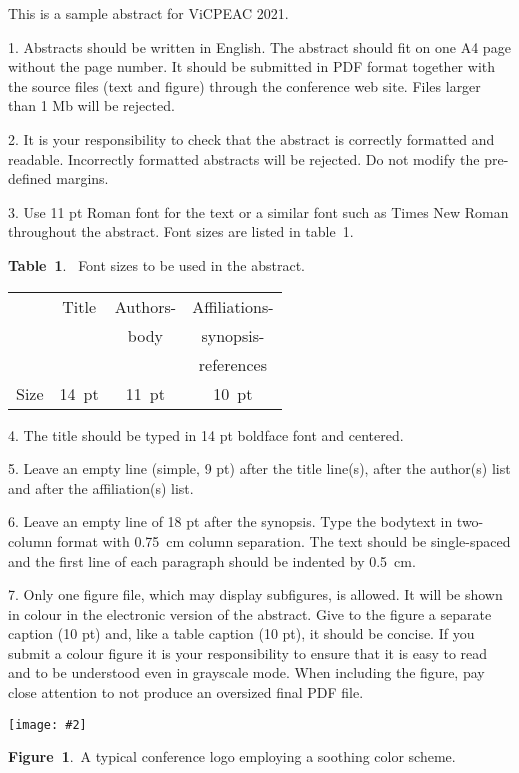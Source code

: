 \documentclass[a4paper,11pt,draft]{article}
\newcommand{\abstracttext}[1]{
\vspace*{0.10cm}
 \columnsep0.75cm
 \begin{multicols}{2} #1 \end{multicols}
}
\newcommand{\capt}[2]{
 \vspace*{-0.3cm}
 \begin{center}
 \begin{minipage}[t]{7.8cm} {\small {\bf Figure~#1}.~#2}
  \end{minipage}
 \end{center}
}
\newcommand{\captTab}[2]{
 \vspace*{-0.1cm}
 \begin{center}
 \begin{minipage}[t]{7.8cm} {\small {\bf Table~#1}.~ #2}
 \end{minipage}
 \end{center}
 \vspace*{0.1cm}
}
\newcommand{\picturelandscape}[2]{
 \vspace*{0.5cm}
 \centerline{
  \texttt{[image: \#2]}
 }
}
\begin{document}
\abstracttext{
This is a sample abstract for ViCPEAC 2021.

1.
Abstracts should be written in English.
The abstract should fit on one A4 page without the page number.
It should be submitted in PDF format together with the source files (text and figure) through the conference web site.
Files larger than 1 Mb will be rejected.

2. It is your responsibility to check that the abstract is correctly formatted and readable.
Incorrectly formatted abstracts will be rejected.
Do not modify the pre-defined margins.

3. Use 11 pt Roman font for the text or a similar font such as Times New Roman throughout the abstract.
Font sizes are listed in table~1.

\begin{center}
\captTab{1}{Font sizes to be used in the abstract.}
\begin{tabular}[b]{lccc}
\hline
   & Title & Authors-               & Affiliations-  \\
   &       & body                  & synopsis- \\
   &       &                       & references  \\
\hline
Size & 14~pt & 11~pt & 10~pt  \\
\hline
\end{tabular}
\end{center}

4. The title should be typed in 14 pt boldface font and centered.

5. Leave an empty line (simple, 9 pt) after the title line(s), after the author(s) list and after the affiliation(s) list.

6. Leave an empty line of 18 pt after the synopsis.
Type the bodytext in two-column format with 0.75~cm column separation.
The text should be single-spaced and the first line of each paragraph should be indented by 0.5~cm.

7. Only one figure file, which may display subfigures, is allowed.
It will be shown in colour in the electronic version of the abstract.
Give to the figure a separate caption (10 pt) and, like a table caption (10 pt), it should be concise.
If you submit a colour figure it is your responsibility to ensure that it is easy to read and to be understood even in grayscale mode.
When including the figure, pay close attention to not produce an oversized final PDF file.

\picturelandscape{0}{ViCPEAC-logo.eps}
\capt{1}{A typical conference logo employing a soothing color scheme.}

}
\end{document}
